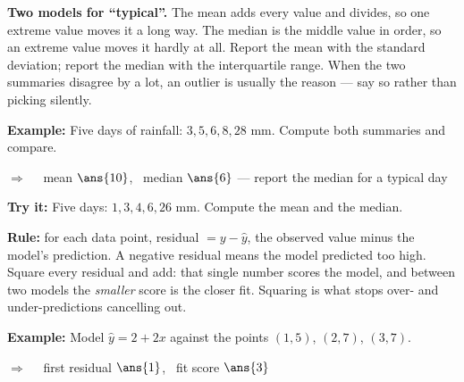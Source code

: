 \documentclass[12pt]{article}
\begin{document}


\begin{formulabox}
\textbf{Two models for ``typical''.} The mean adds every value and divides, so
one extreme value moves it a long way. The median is the middle value in order,
so an extreme value moves it hardly at all. Report the mean with the standard
deviation; report the median with the interquartile range. When the two
summaries disagree by a lot, an outlier is usually the reason --- say so rather
than picking silently.
\end{formulabox}

\begin{examplebox}
\textbf{Example:} \quad Five days of rainfall: $3, 5, 6, 8, 28$ mm. Compute both
summaries and compare.

$\Rightarrow\quad$ mean $\ans{10}$, \ median $\ans{6}$ --- report the median for a typical day
\end{examplebox}

\begin{tryitbox}
\textbf{Try it:} \quad Five days: $1, 3, 4, 6, 26$ mm. Compute the mean and the
median.\\[2pt]
\end{tryitbox}


\begin{formulabox}
\textbf{Rule:} for each data point, residual $= y - \hat{y}$, the observed value
minus the model's prediction. A negative residual means the model predicted too
high. Square every residual and add: that single number scores the model, and
between two models the \emph{smaller} score is the closer fit. Squaring is what
stops over- and under-predictions cancelling out.
\end{formulabox}

\begin{examplebox}
\textbf{Example:} \quad Model $\hat{y} = 2 + 2x$ against the points $(1,5)$,
$(2,7)$, $(3,7)$.

$\Rightarrow\quad$ first residual $\ans{1}$, \ fit score $\ans{3}$
\end{examplebox}
\end{document}
